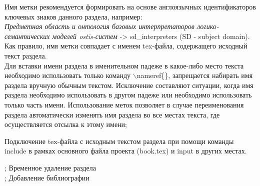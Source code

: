 {{{\begin{scnitemizeii}
				Имя метки рекомендуется формировать на основе англоязычных идентификаторов ключевых знаков данного раздела, например:\\  \textit{Предметная область и онтология базовых интерпретаторов логико-семантических моделей ostis-систем} -> sd\_interpreters (SD - subject domain). Как правило, имя метки совпадает с именем tex-файла, содержащего исходный текст раздела.\\
				Для вставки имени раздела в именительном падеже в какое-либо место текста необходимо использовать только команду $\backslash$nameref\{<имя метки>\}, запрещается набирать имя раздела вручную обычным текстом. Исключение составляют ситуации, когда имя раздела необходимо использовать в другом падеже или необходимо использовать только часть имени. Использование меток позволяет в случае переименования раздела автоматически изменять имя раздела во все местах текста, где осуществляется отсылка к этому имени;
				\item Подключение tex-файла с исходным текстом раздела при помощи команды include в рамках основного файла проекта (book.tex) и input в других местах.
			\end{scnitemizeii}
	}
	};
	Временное удаление раздела\\
		;
	Добавление библиографии\\
	}
